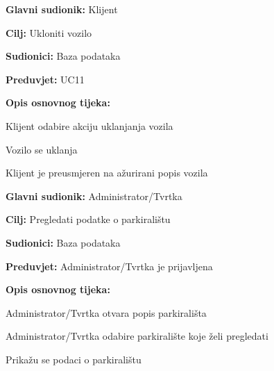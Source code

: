 \noindent {}
\begin{packed_item}
	
	\item \textbf{Glavni sudionik:} Klijent
	\item \textbf{Cilj:} Ukloniti vozilo
	\item \textbf{Sudionici:} Baza podataka
	\item \textbf{Preduvjet:} UC11
	\item \textbf{Opis osnovnog tijeka:}
	
	\item[] \begin{packed_enum}
		
		\item Klijent odabire akciju uklanjanja vozila
		\item Vozilo se uklanja
		\item Klijent je preusmjeren na ažurirani popis vozila

	\end{packed_enum}
\end{packed_item}

\pagebreak

\noindent {}
\begin{packed_item}
	
	\item \textbf{Glavni sudionik: } Administrator/Tvrtka
	\item \textbf{Cilj:} Pregledati podatke o parkiralištu
	\item \textbf{Sudionici:} Baza podataka
	\item \textbf{Preduvjet:} Administrator/Tvrtka je prijavljena
	\item \textbf{Opis osnovnog tijeka:}
	
	\item[] \begin{packed_enum}
		
		\item Administrator/Tvrtka otvara popis parkirališta
		\item Administrator/Tvrtka odabire parkiralište koje želi pregledati
		\item Prikažu se podaci o parkiralištu
	
	\end{packed_enum}
\end{packed_item}

